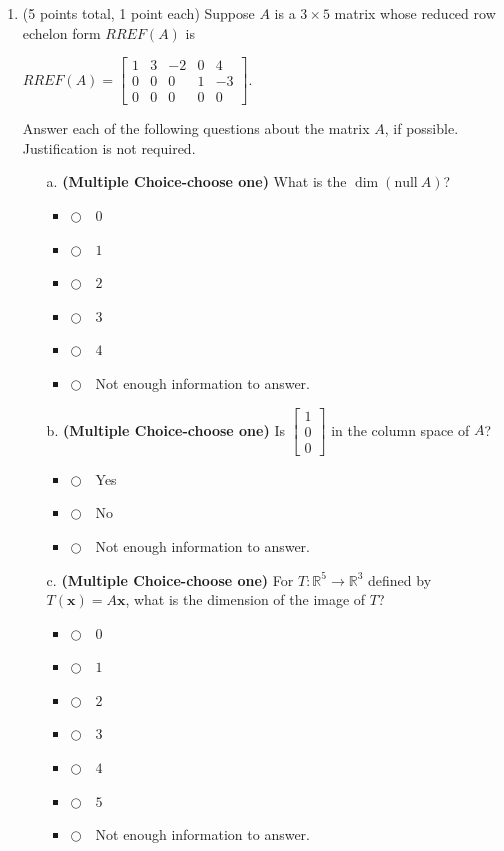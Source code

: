 \documentclass[12pt]{extarticle}
\newcommand{\chooseone}{{\Large$\Circle$\ \ }}
\begin{document}
\begin{enumerate}
 
 \newpage


\item (5 points total, 1 point each) Suppose $A$ is a $3\times 5$ matrix whose reduced row echelon form $RREF(A)$ is 

$RREF(A)=\left[\begin{array}{ccccc}1 & 3 & -2 & 0 & 4 \\ 0 & 0 & 0 & 1 & -3 \\ 0 & 0 & 0 & 0 & 0 \end{array}\right]$.

Answer each of the following questions about the matrix $A$, if possible. Justification is not required.



\begin{itemize}
   \item[a.]  \textbf{(Multiple Choice-choose one)} What is the $\dim(\text{null}\ A)$?
\begin{itemize}[label={}]
\item \chooseone $0$
\item \chooseone $1$
\item \chooseone $2$
\item \chooseone $3$
\item \chooseone $4$
\item \chooseone Not enough information to answer.
\end{itemize}    


     \vfill

     \item[b.] \textbf{(Multiple Choice-choose one)}  Is $\begin{bmatrix} 1 \\ 0 \\ 0\end{bmatrix}$ in the column space of $A$?
\begin{itemize}[label={}]
\item \chooseone Yes
\item \chooseone No
\item \chooseone Not enough information to answer.
\end{itemize}  
     \vfill


     \item[c.] \textbf{(Multiple Choice-choose one)} For $T:\mathbb{R}^5\to\mathbb{R}^3$ defined by $T(\mathbf{x})=A\mathbf{x}$, what is the dimension of the image of $T$?
\begin{itemize}[label={}]
\item \chooseone $0$
\item \chooseone $1$
\item \chooseone $2$
\item \chooseone $3$
\item \chooseone $4$
\item \chooseone $5$
\item \chooseone Not enough information to answer.
\end{itemize}     
     

\end{itemize}
\end{enumerate}
\end{document}
